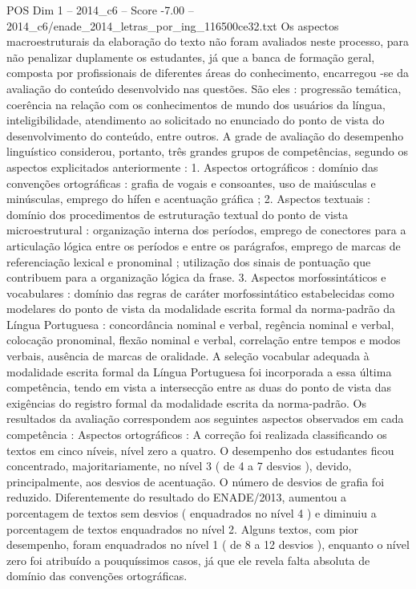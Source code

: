 \begin{textsample}{POS Dim 1 – 2014\_c6 – Score -7.00 – 2014\_c6/enade\_2014\_letras\_por\_ing\_116500ce32.txt}
Os aspectos macroestruturais da elaboração do texto não foram avaliados neste processo, para não penalizar duplamente os estudantes, já que a banca de formação geral, composta por profissionais de diferentes áreas do conhecimento, encarregou -se da avaliação do conteúdo desenvolvido nas questões.
São eles : progressão temática, coerência na relação com os conhecimentos de mundo dos usuários da língua, inteligibilidade, atendimento ao solicitado no enunciado do ponto de vista do desenvolvimento do conteúdo, entre outros.
A grade de avaliação do desempenho linguístico considerou, portanto, três grandes grupos de competências, segundo os aspectos explicitados anteriormente : 1.
Aspectos ortográficos : domínio das convenções ortográficas : grafia de vogais e consoantes, uso de maiúsculas e minúsculas, emprego do hífen e acentuação gráfica ; 2.
Aspectos textuais : domínio dos procedimentos de estruturação textual do ponto de vista microestrutural : organização interna dos períodos, emprego de conectores para a articulação lógica entre os períodos e entre os parágrafos, emprego de marcas de referenciação lexical e pronominal ; utilização dos sinais de pontuação que contribuem para a organização lógica da frase. 3.
Aspectos morfossintáticos e vocabulares : domínio das regras de caráter morfossintático estabelecidas como modelares do ponto de vista da modalidade escrita formal da norma-padrão da Língua Portuguesa : concordância nominal e verbal, regência nominal e verbal, colocação pronominal, flexão nominal e verbal, correlação entre tempos e modos verbais, ausência de marcas de oralidade.
A seleção vocabular adequada à modalidade escrita formal da Língua Portuguesa foi incorporada a essa última competência, tendo em vista a intersecção entre as duas do ponto de vista das exigências do registro formal da modalidade escrita da norma-padrão.
Os resultados da avaliação correspondem aos seguintes aspectos observados em cada competência : Aspectos ortográficos : A correção foi realizada classificando os textos em cinco níveis, nível zero a quatro.
O desempenho dos estudantes ficou concentrado, majoritariamente, no nível 3 ( de 4 a 7 desvios ), devido, principalmente, aos desvios de acentuação.
O número de desvios de grafia foi reduzido.
Diferentemente do resultado do ENADE/2013, aumentou a porcentagem de textos sem desvios ( enquadrados no nível 4 ) e diminuiu a porcentagem de textos enquadrados no nível 2.
Alguns textos, com pior desempenho, foram enquadrados no nível 1 ( de 8 a 12 desvios ), enquanto o nível zero foi atribuído a pouquíssimos casos, já que ele revela falta absoluta de domínio das convenções ortográficas.

\end{textsample}
